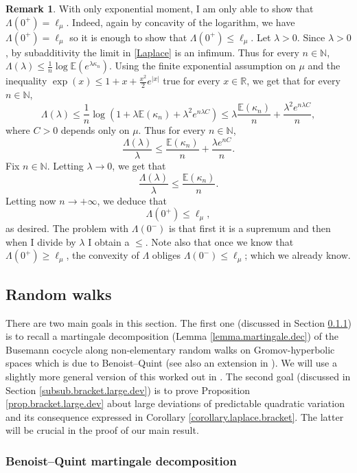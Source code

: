 \documentclass[10pt]{amsart}
\theoremstyle{plain}
\theoremstyle{definition}
\newtheorem{remark}[theorem]{Remark}
\newcommand\E{\mathbb{E}}
\newcommand\R{\mathbb{R}}
\newcommand\N{\mathbb{N}}
\begin{document}
\begin{remark}
With only exponential moment, I am only able to show that
$\Lambda(0^+)=\ell_\mu$. Indeed, again by concavity of the logarithm, we have $\Lambda(0^+)=\ell_\mu$ so it is enough to show that $\Lambda(0^+)\leq \ell_\mu$. Let $\lambda>0$.
Since $\lambda>0$, by subadditivity the limit in \eqref{Laplace} is an infimum. Thus for every $n\in \N$,
$\Lambda(\lambda)\leq \frac{1}{n} \log \E(e^{\lambda \kappa_n})$.
Using the finite exponential assumption on $\mu$ and the inequality $\exp(x)\leq 1+x+\frac{x^2}{2} e^{|x|}$ true for every $x\in \R$, we get that for every $n\in \N$,
\[
\Lambda(\lambda)\leq \frac{1}{n} \log(1+ \lambda \E(\kappa_n) + \lambda^2 e^{n \lambda C}) \leq \lambda \frac{\E(\kappa_n)}{n} + \frac{\lambda^2 e^{n \lambda C}}{n},
\]
where $C>0$ depends only on $\mu$.
Thus for every $n\in \N$,
\[
\frac{\Lambda(\lambda)}{\lambda}\leq \frac{\E(\kappa_n)}{n} + \frac{\lambda e^{nC}}{n}.
\]
Fix $n\in \N$. Letting $\lambda\to 0$, we get that
\[
\frac{\Lambda(\lambda)}{\lambda}\leq \frac{\E(\kappa_n)}{n}.
\]
Letting now $n\to +\infty$, we deduce that
\[
\Lambda(0^+)\leq \ell_{\mu},
\]
as desired.
The problem with $\Lambda(0^-)$ is that first it is a supremum and then when I divide by $\lambda$ I obtain a $\leq$. Note also that once we know that $\Lambda(0^+)\geq \ell_{\mu}$, the convexity of $\Lambda$ obliges $\Lambda(0^-)\leq \ell_{\mu}$; which we already know.
\end{remark}
\fi

\subsection{Random walks}
\label{sec.large.deviation}
There are two main goals in this section. The first one (discussed in Section \ref{subsub.mart.dec}) is to recall a martingale decomposition (Lemma \ref{lemma.martingale.dec}) of the Busemann cocycle along non-elementary random walks on Gromov-hyperbolic spaces which is due to Benoist--Quint \cite{BQ.CLT,BQ.hyperbolic} (see also an extension in \cite{horbez}). We will use a slightly more general version of this worked out in \cite{aoun-sert}. The second goal (discussed in Section \ref{subsub.bracket.large.dev}) is to prove Proposition \ref{prop.bracket.large.dev} about large deviations of predictable quadratic variation and its consequence expressed in Corollary \ref{corollary.laplace.bracket}. The latter will be crucial in the proof of our main result.

\subsubsection{Benoist--Quint martingale decomposition}\label{subsub.mart.dec}
\end{document}
